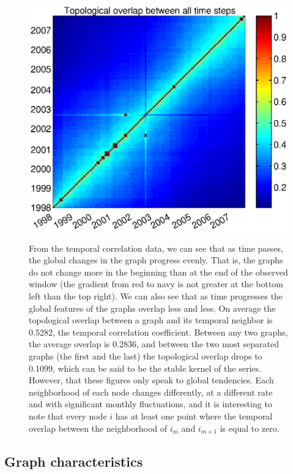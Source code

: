 \documentclass[12pt]{article}
\begin{document}
\begin{figure}[H]
\includegraphics[trim = 0cm 0cm 0cm 0cm, width = .9\textwidth]{Graficos/overlap.eps}
\label{fig:overlap}
\caption{From the temporal correlation data, we can see that as time passes, the global changes in the graph progress evenly. That is, the graphs do not change more in the beginning than at the end of the observed window (the gradient from red to navy is not greater at the bottom left than the top right). We can also see that as time progresses the global features of the graphs overlap less and less. On average the topological overlap between a graph and its temporal neighbor is 0.5282, the temporal correlation coefficient. Between any two graphs, the average overlap is 0.2836, and between the two most separated graphs (the first and the last) the topological overlap drops to 0.1099, which can be said to be the stable kernel of the series. \newline However, that these figures only speak to global tendencies. Each neighborhood of each node changes differently, at a different rate and with significant monthly fluctuations, and it is interesting to note that every node \(i\) has at least one point where the temporal overlap between the neighborhood of \(i_m\) and \(i_{m+1}\) is equal to zero.}
\end{figure}



\subsection{Graph characteristics}
\end{document}
